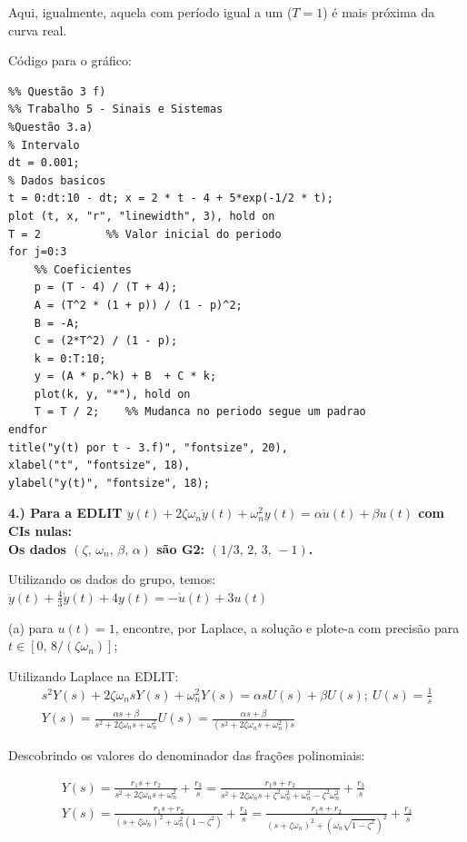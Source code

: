 \documentclass[10pt]{article}
\begin{document}
Aqui, igualmente, aquela com período igual a um ($T = 1$) é mais próxima da curva real.

Código para o gráfico:
\begin{verbatim}
%% Questão 3 f)
%% Trabalho 5 - Sinais e Sistemas
%Questão 3.a)
% Intervalo
dt = 0.001;
% Dados basicos
t = 0:dt:10 - dt; x = 2 * t - 4 + 5*exp(-1/2 * t);
plot (t, x, "r", "linewidth", 3), hold on
T = 2          %% Valor inicial do periodo
for j=0:3
    %% Coeficientes
    p = (T - 4) / (T + 4);
    A = (T^2 * (1 + p)) / (1 - p)^2;
    B = -A;
    C = (2*T^2) / (1 - p);
    k = 0:T:10;
    y = (A * p.^k) + B  + C * k;
    plot(k, y, "*"), hold on
    T = T / 2;    %% Mudanca no periodo segue um padrao
endfor
title("y(t) por t - 3.f)", "fontsize", 20),
xlabel("t", "fontsize", 18),
ylabel("y(t)", "fontsize", 18);
\end{verbatim}

\vspace{\baselineskip}

\textbf{4.) Para a EDLIT $\ddot{y}(t) + 2\zeta \omega_n \dot{y}(t) + \omega_n^2 y(t) = \alpha \dot{u}(t) + \beta u(t)$ com CIs nulas:\\
Os dados $(\zeta,\, \omega_n,\, \beta,\, \alpha)$ são \textbf{G2: }$(1/3,\, 2,\, 3,\, -1)$.}

Utilizando os dados do grupo, temos: $\ddot{y}(t) + \frac{4}{3} \dot{y}(t) + 4 y(t) = -\dot{u}(t) + 3u(t)$

(a) para $u(t) = 1$, encontre, por Laplace, a solução e plote-a com precisão para $t \in [0,\, 8/(\zeta \omega_n)]$;

\vspace{\baselineskip}

Utilizando Laplace na EDLIT:
\begin{align*}
    s^2Y(s) + 2\zeta \omega_n sY(s) + \omega_n^2 Y(s) = \alpha sU(s) + \beta U(s); \ U(s) = \frac{1}{s} \\
    Y(s) = \frac{\alpha s + \beta}{s^2 + 2\zeta \omega_n s + \omega_n^2} U(s) = \frac{\alpha s + \beta}{(s^2 + 2\zeta \omega_n s + \omega_n^2)s}
\end{align*}

Descobrindo os valores do denominador das frações polinomiais:

\begin{align*}
    Y(s) = \frac{r_1 s + r_2}{s^2 + 2\zeta \omega_n s + \omega_n^2} + \frac{r_3}{s} = \frac{r_1 s + r_2}{s^2 + 2\zeta \omega_n s + \zeta^2 \omega_n^2 + \omega_n^2 - \zeta^2 \omega_n^2} + \frac{r_3}{s} \\
    Y(s) = \frac{r_1 s + r_2}{(s + \zeta \omega_n)^2 + \omega_n^2 (1 - \zeta^2)} + \frac{r_3}{s} = \frac{r_1 s + r_2}{(s + \zeta \omega_n)^2 + (\omega_n \sqrt{1 - \zeta^2})^2} + \frac{r_3}{s}
\end{align*}
\end{document}
